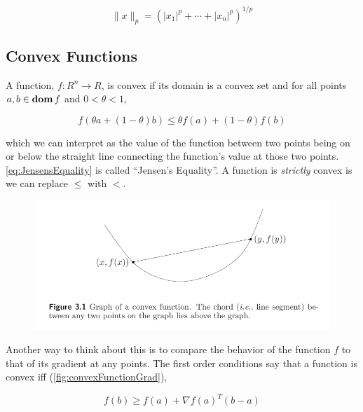 \documentclass{article}
\begin{document}
\begin{equation}
    \parallel x \parallel_p = (|x_1|^p + \cdots + |x_n|^p)^{1/p}
\end{equation}


\subsection{Convex Functions}

A function, $f: R^n \rightarrow R$, is convex if its domain is a convex set and for all points $a, b \in \boldsymbol{\rm dom}\, f$ and $0 < \theta < 1$,

\begin{equation}
    f( \theta a + (1 - \theta) b ) \leq \theta f(a) + (1- \theta) f(b)
    \label{eq:JensensEquality}
\end{equation}

\noindent
which we can interpret as the value of the function between two points being on or below the straight line connecting the function's value at those two points. \autoref{eq:JensensEquality} is called ``Jensen's Equality''.
A function is {\em strictly\/} convex is we can replace $\leq$ with $<$.

\begin{figure}[h!]
    \centering
    \includegraphics[width=1\textwidth]{./figures/ConvexFunction.png}
\end{figure}

Another way to think about this is to compare the behavior of the function $f$ to that of its gradient at any points.
The first order conditions say that a function is convex iff (\autoref{fig:convexFunctionGrad}),

\begin{equation}
    f(b) \geq f(a) + \nabla f(a)^T (b - a)
    \label{eq:firstOrderCondition}
\end{equation}
\end{document}
